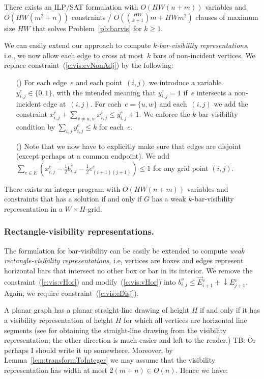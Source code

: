 \documentclass[runningheads]{llncs}
\newcommand{\comment}[1]{{\color{red} #1}}
\newcommand{\rowsum}[1]{{\overset{\rightarrow}{#1}}}
\newcommand{\columnsum}[1]{{\downarrow\!#1}}
\newcounter{constr}
\newcommand{\constr}[1]{\noindent \refstepcounter{constr}\theconstr #1}
\begin{document}
\begin{theorem}\label{thm:barkvis}
	There exists an ILP/SAT formulation with $O(HW(n+m))$ variables and
$O(HW(m^2+n))$ constraints / $O(\binom{HW}{k+1} m + HW m^2)$ clauses
of maximum size $HW$ that solves Problem~\ref{pb:barvis} for $k\ge 1$.
\end{theorem}



\iffalse


We can easily extend our approach to compute 
\emph{$k$-bar-visibility representations}\cite{???},
i.e., we now allow each edge to cross at most~$k$ bars of 
non-incident vertices.
We replace constraint~(\ref{c:vis:evNonAdj}) by the following:
\begin{itemize}
  \item[(\constr{\label{c:vis:kbar}})]
  For each edge~$e$ and each point~$(i,j)$ we introduce 
  a variable~$y_{i,j}^e \in \{ 0,1\}$, with the intended meaning that
  $y_{i,j}^e = 1$ if~$e$ intersects a non-incident edge at~$(i,j)$.
  For each~$e=\{ u,w\}$ and each~$(i,j)$ we add the constraint
  $x_{i,j}^e + \sum_{v \neq u,w} x_{i,j}^v \leq y_{i,j}^e + 1$.
  We enforce the $k$-bar-visibility condition by $\sum_{i,j} y_{i,j}^e \leq k$
  for each~$e$.
  \item[(\constr{\label{c:vis:eDisj}})]
  Note that we now have to explicitly make sure that edges are disjoint (except perhaps at a common
  endpoint). We add
  $\sum_{e\in E} (x_{i,j}^e-\frac{1}{2}b_{i,j}^e-\frac{1}{2}e_{(i+1)(j+1)}^e) \leq 1$
  for any grid point $(i,j)$.  
\end{itemize}
\begin{lemma}
There exists an integer program with $O(HW(n+m))$ variables and
constraints that has a solution if and only if $G$  has a
weak $k$-bar-visibility representation in a $W\times H$-grid.
\end{lemma}
\subsubsection{Rectangle-visibility representations.}
The formulation for bar-visibility can be easily be extended to compute 
\emph{weak rectangle-visibility representations}\cite{???},
i.e, vertices are boxes and edges represent horizontal bars
that intersect no other box or bar in its interior.
We remove the constraint~(\ref{c:vis:vHor})
and modify~(\ref{c:vis:vHor})
into $b_{i,j}^v \leq \rowsum{E}{_{i+1}^v} + \columnsum{E}{_{j+1}^v}$.
Again, we require constraint~(\ref{c:vis:eDisj}).
\par
A planar graph has a planar straight-line drawing of
height $H$ if and only if it has a visibility representation
of height $H$ for which all vertices are horizontal line 
segments (see \cite{Bie-WAOA12} for obtaining the straight-line
drawing from the visibility representation; the other direction
is much easier and left to the reader.)
\comment{TB: Or perhaps I should write it up somewhere.}
Moreover, by Lemma~\ref{lem:transformToInteger} we may
assume that the visibility representation has width at most $2(m+n)\in O(n)$.
Hence we have:
\end{document}
